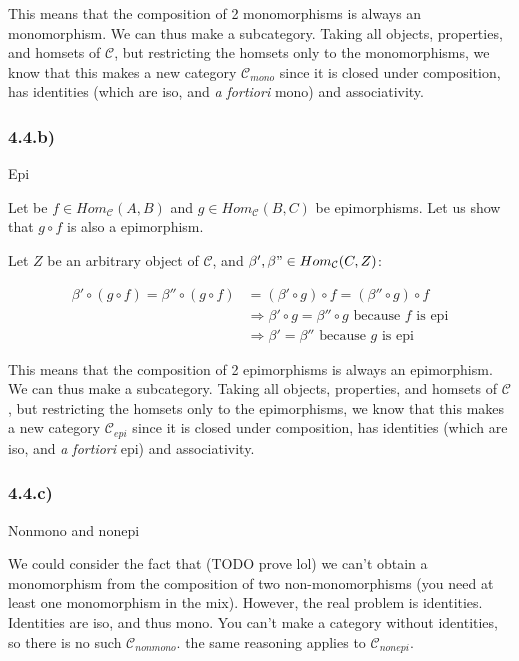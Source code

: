 \documentclass[12pt, letterpaper, twoside]{report}
\begin{document}
This means that the composition of 2 monomorphisms is always an monomorphism. We can thus make a subcategory. Taking all objects, properties, and homsets of $\mathcal{C}$, but restricting the homsets only to the monomorphisms, we know that this makes a new category $\mathcal{C}_{mono}$ since it is closed under composition, has identities (which are iso, and \textit{a fortiori} mono) and associativity.


\subsubsection*{4.4.b)} Epi

Let be $f \in Hom_{\mathcal{C}} (A, B)$ and $g \in Hom_{\mathcal{C}} (B, C)$ be epimorphisms. Let us show that $g \circ f$ is also a epimorphism.

Let $Z$ be an arbitrary object of $\mathcal{C}$, and $\beta', \beta" \in Hom_{\mathcal{C}} (C, Z)$:

$$
\begin{aligned}
	\beta' \circ (g \circ f) = \beta'' \circ (g \circ f)
		& = (\beta' \circ g) \circ f = (\beta'' \circ g) \circ f \\
		& \Rightarrow \beta' \circ g =  \beta'' \circ g \text{ because $f$ is epi} \\
		& \Rightarrow \beta'         =  \beta''         \text{ because $g$ is epi}
\end{aligned}
$$

This means that the composition of 2 epimorphisms is always an epimorphism. We can thus make a subcategory. Taking all objects, properties, and homsets of $\mathcal{C}$, but restricting the homsets only to the epimorphisms, we know that this makes a new category $\mathcal{C}_{epi}$ since it is closed under composition, has identities (which are iso, and \textit{a fortiori} epi) and associativity.


\subsubsection*{4.4.c)} Nonmono and nonepi

We could consider the fact that (TODO prove lol) we can't obtain a monomorphism from the composition of two non-monomorphisms (you need at least one monomorphism in the mix). However, the real problem is identities. Identities are iso, and thus mono. You can't make a category without identities, so there is no such $\mathcal{C}_{nonmono}$. the same reasoning applies to $\mathcal{C}_{nonepi}$.
\end{document}
